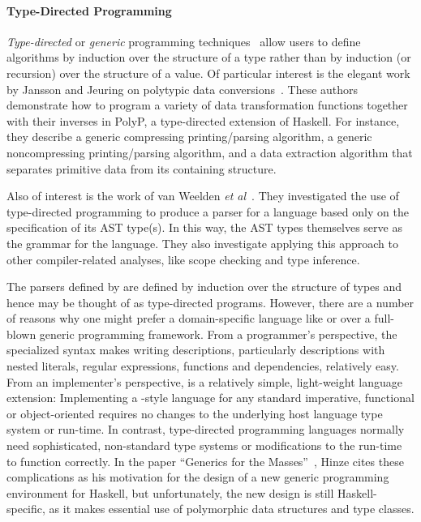 \paragraph*{Type-Directed Programming}
{\em Type-directed} or
{\em generic} programming techniques~\cite{jansson+:97,jansson+:99,jansson:phdthesis,hinze+:generic-programming,jansson+:02,lammel+:syb} allow users to
define algorithms by induction over the structure of a type rather 
than by induction (or recursion) over the structure of a value.  
Of particular interest is the
elegant work by Jansson and Jeuring on polytypic data 
conversions~\cite{jansson+:97,jansson+:99,jansson:phdthesis,jansson+:02}.
These authors demonstrate how to program a variety of data 
transformation functions together with their inverses in PolyP, a 
type-directed extension of Haskell. For instance, they describe a 
generic compressing printing/parsing algorithm, a generic 
noncompressing printing/parsing algorithm, and a data
extraction algorithm that separates primitive data from its
containing structure.  

Also of interest is the work of 
van Weelden \textit{et al}~\cite{weelden+:polytypic-ast}.
They investigated the use of
type-directed programming to produce a parser for a language based only on
the specification of its AST type(s). In this way, the AST types
themselves serve as the grammar for the language. They also
investigate applying this approach to other compiler-related analyses,
like scope checking and type inference.

The parsers defined by \ddc{} are defined by induction over the structure
of types and hence may be thought of as type-directed programs.  However,
there are a number of reasons why one might prefer a domain-specific
language like \pads{} or \ddc{} over a full-blown
generic programming framework.  
From a programmer's perspective, the specialized syntax makes writing
descriptions, particularly descriptions with nested literals, 
regular expressions, functions and dependencies, relatively easy.
From an implementer's perspective, \pads{} is a
relatively simple, light-weight language extension:  Implementing a 
\pads{}-style language for any standard imperative, functional or 
object-oriented requires no changes to the underlying host language
type system or run-time.  In contrast, type-directed
programming languages normally need sophisticated, non-standard type systems
or modifications to the run-time to function correctly.  In the
paper ``Generics for the Masses''~\cite{hinze:masses}, Hinze cites these
complications as his motivation for the design of a new generic programming
environment for Haskell, but unfortunately, the new design is still
Haskell-specific, as it makes essential use of polymorphic data
structures and type classes.  


